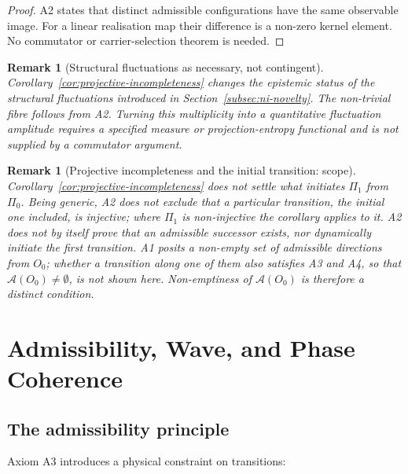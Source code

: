 \documentclass[11pt,a4paper]{article}
\newtheorem{remark}[theorem]{Remark}
\begin{document}
    \begin{proof}
      A2 states that distinct admissible configurations have the same observable
      image.
      For a linear realisation map their difference is a non-zero kernel element.
      No commutator or carrier-selection theorem is needed.
    \end{proof}

    \begin{remark}[Structural fluctuations as necessary, not contingent]
      \label{rem:fluctuations-necessary}
      Corollary~\ref{cor:projective-incompleteness} changes the epistemic status of the
      structural fluctuations introduced in Section~\ref{subsec:ni-novelty}.
      The non-trivial fibre follows from A2.
      Turning this multiplicity into a quantitative fluctuation amplitude requires a
      specified measure or projection-entropy functional and is not supplied by a
      commutator argument.
    \end{remark}

    \begin{remark}[Projective incompleteness and the initial transition: scope]
      \label{rem:first-transition}
      Corollary~\ref{cor:projective-incompleteness} does not settle what initiates $\Pi_1$ from $\Pi_0$.
      Being generic, A2 does not exclude that a particular transition, the initial one included,
      is injective; where $\Pi_1$ is non-injective the corollary applies to it.
      A2 does not by itself prove that an admissible successor exists, nor dynamically initiate
      the first transition.
      A1 posits a non-empty set of admissible directions from $O_0$; whether a transition along one of them
      also satisfies A3 and A4, so that $\mathcal{A}(O_0) \neq \emptyset$, is not shown here.
      Non-emptiness of $\mathcal{A}(O_0)$ is therefore a distinct condition.
    \end{remark}

  \section{Admissibility, Wave, and Phase Coherence}
  \label{sec:admissibility}

  \subsection{The admissibility principle}

    Axiom A3 introduces a physical constraint on transitions:
\end{document}
